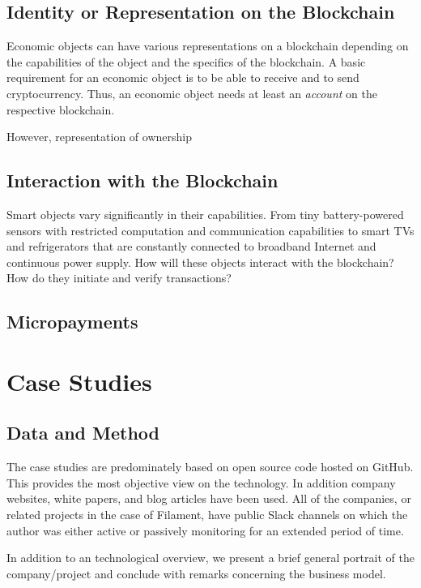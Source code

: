 \subsection{Identity or Representation on the Blockchain}

Economic objects can have various representations on a blockchain depending on the capabilities of the object and the specifics of the blockchain. A basic requirement for an economic object is to be able to receive and to send cryptocurrency. Thus, an economic object needs at least an \emph{account} on the respective blockchain.

However, representation of ownership 

\subsection{Interaction with the Blockchain}

Smart objects vary significantly in their capabilities. From tiny battery-powered sensors with restricted computation and communication capabilities to smart TVs and refrigerators that are constantly connected to broadband Internet and continuous power supply. How will these objects interact with the blockchain? How do they initiate and verify transactions? 

\subsection{Micropayments}


\section{Case Studies}

\subsection{Data and Method}

The case studies are predominately based on open source code hosted on GitHub. This provides the most objective view on the technology. In addition company websites, white papers, and blog articles have been used. All of the companies, or related projects in the case of Filament, have public Slack channels on which the author was either active or passively monitoring for an extended period of time.

In addition to an technological overview, we present a brief general portrait of the company/project and conclude with remarks concerning the business model. 

